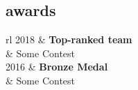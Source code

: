 \documentclass[12pt]{article}
\newcommand{\tableentry}[3]{\textsc{#1} & #2\expandafter\ifstrequal\expandafter{#3}{}{\\}{\\[6pt]}}
\begin{document}
\begin{paracol}{2}
\bigskip

\section{awards}
\begin{supertabular}{rl}
  \tableentry{2018}{\textbf{Top-ranked team}}{}
  \tableentry{}{Some Contest}{spaceafter}
  \tableentry{2016}{\textbf{Bronze Medal}}{}
  \tableentry{}{Some Contest}{spaceafter}
\end{supertabular}

\end{paracol}

\vspace*{\fill}
\end{document}
